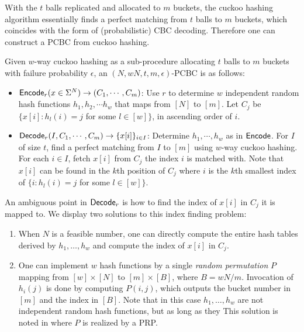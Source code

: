 With the $t$ balls replicated and allocated to $m$ buckets, the cuckoo hashing algorithm essentially finds a perfect matching from $t$ balls to $m$ buckets, which coincides with the form of (probabilistic) CBC decoding. Therefore one can construct a PCBC from cuckoo hashing. 

\begin{construction}
  Given $w$-way cuckoo hashing as a sub-procedure allocating $t$ balls to $m$ buckets with failure probability $\epsilon$, an $(N,wN,t,m,\epsilon)$-PCBC is as follows: 
  \begin{itemize}
    \item ${\sf Encode}_r(x\in\Sigma^N)\rightarrow (C_1,\cdots,C_m)$: Use $r$ to determine $w$ independent random hash functions $h_1,h_2,\cdots h_w$ that maps from $[N]$ to $[m]$.  Let $C_j$ be $\{x[i]:h_l(i) = j$ for some $l\in [w]\}$, in ascending order of $i$. 
    \item ${\sf Decode}_r(I, C_1,\cdots, C_m)\rightarrow \{x[i]\}_{i\in I}$: Determine $h_1,\cdots, h_w$ as in ${\sf Encode}$. For $I$ of size $t$, find a perfect matching from $I$ to $[m]$ using $w$-way cuckoo hashing. For each $i\in I$, fetch $x[i]$ from $C_j$ the index $i$ is matched with. Note that $x[i]$ can be found in the $k$th position of $C_j$ where $i$ is the $k$th smallest index of $\{i:h_l(i) = j$ for some $l\in [w]\}$. 
  \end{itemize}
\end{construction}
An ambiguous point in ${\sf Decode}_r$ is how to find the index of $x[i]$ in $C_j$ it is mapped to. We  display two solutions to this index finding problem: 
\begin{enumerate}
  \item When $N$ is a feasible number, one can directly compute the entire hash tables derived by $h_1,\dots, h_w$ and compute the index of $x[i]$ in $C_j$. 
  \item One can implement $w$ hash functions by a single \emph{random permutation} $P$ mapping from $[w]\times [N]$ to $[m]\times [B]$, where $B = wN/m$. Invocation of $h_i(j)$ is done by computing $P(i,j)$, which outputs the bucket number in $[m]$ and the index in $[B]$. Note that in this case $h_1,\dots,h_w$ are not independent random hash functions, but as long as they This solution is noted in \cite{cryptoeprint:2021/580} where $P$ is realized by a PRP. 
\end{enumerate}
